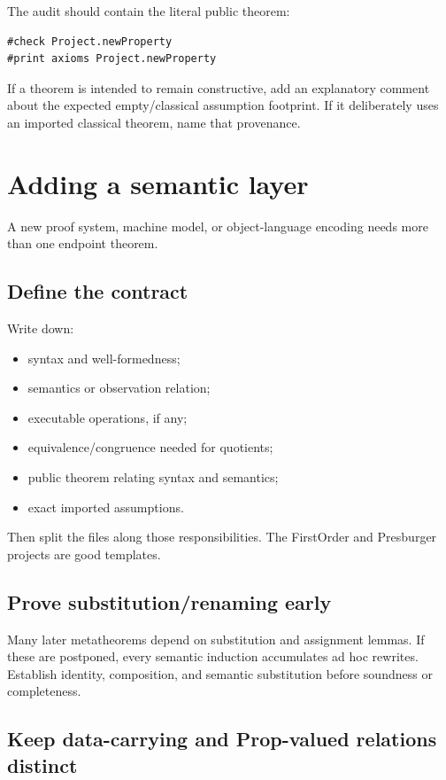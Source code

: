 \documentclass[
  10pt,
  a4paper,
  twoside,
  open=any,
  parskip=half,
  headings=big
]{scrreprt}
\begin{document}
The audit should contain the literal public theorem:

\begin{lstlisting}[language=Lean]
#check Project.newProperty
#print axioms Project.newProperty
\end{lstlisting}

If a theorem is intended to remain constructive, add an explanatory comment
about the expected empty/classical assumption footprint.  If it deliberately
uses an imported classical theorem, name that provenance.

\section{Adding a semantic layer}

A new proof system, machine model, or object-language encoding needs more than
one endpoint theorem.

\subsection{Define the contract}

Write down:

\begin{itemize}
  \item syntax and well-formedness;
  \item semantics or observation relation;
  \item executable operations, if any;
  \item equivalence/congruence needed for quotients;
  \item public theorem relating syntax and semantics;
  \item exact imported assumptions.
\end{itemize}

Then split the files along those responsibilities.  The FirstOrder and
Presburger projects are good templates.

\subsection{Prove substitution/renaming early}

Many later metatheorems depend on substitution and assignment lemmas.  If these
are postponed, every semantic induction accumulates ad hoc rewrites.  Establish
identity, composition, and semantic substitution before soundness or
completeness.

\subsection{Keep data-carrying and Prop-valued relations distinct}
\end{document}
